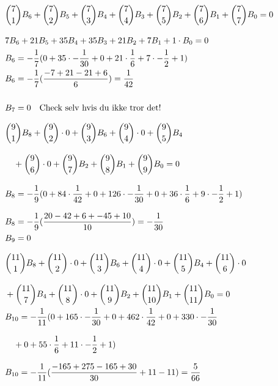 \begin{align*}
&\MinLinie
&\binom{7}{1}B_{6}+\binom{7}{2}B_{5}+\binom{7}{3}B_{4}+\binom{7}{4}B_{3}+\binom{7}{5}B_{2}+\binom{7}{6}B_{1}+\binom{7}{7}B_{0}=0\nylinie
&7B_{6}+21B_{5}+35B_{4}+35B_{3}+21B_{2}+7B_{1}+1 \cdot B_{0}=0\\
&B_{6}=-\frac{1}{7}(0+35 \cdot -\frac{1}{30}+0+21 \cdot \frac{1}{6}+7 \cdot -\frac{1}{2}+1)\\
&B_{6}=-\frac{1}{7}(\frac{-7+21-21+6}{6})=\frac{1}{42}\\\\
&B_{7}=0 \quad \text{Check selv hvis du ikke tror det!}\\
\end{align*}
\begin{align*}
&\MinLinie
&\binom{9}{1}B_{8}+\binom{9}{2} \cdot 0+\binom{9}{3}B_{6}+\binom{9}{4} \cdot 0+\binom{9}{5}B_{4}\nylinie
&\quad +\binom{9}{6} \cdot 0+\binom{9}{7}B_{2}+\binom{9}{8}B_{1}+\binom{9}{9}B_{0}=0\nylinie
&B_{8}=-\frac{1}{9}(0+84 \cdot \frac{1}{42}+0+126 \cdot -\frac{1}{30}+0+36 \cdot \frac{1}{6}+9 \cdot -\frac{1}{2}+1)\nylinie
&B_{8}=-\frac{1}{9}(\frac{20-42+6+-45+10}{10})=-\frac{1}{30}\\
&B_{9}=0\\
\end{align*}
\begin{align*}
&\MinLinie
&\binom{11}{1}B_{8}+\binom{11}{2} \cdot 0+\binom{11}{3}B_{6}+\binom{11}{4} \cdot 0+\binom{11}{5}B_{4}+\binom{11}{6} \cdot 0\nylinie
&+\binom{11}{7}B_{4}+\binom{11}{8} \cdot 0+\binom{11}{9}B_{2}+\binom{11}{10}B_{1}+\binom{11}{11}B_{0}=0\\
&B_{10}=-\frac{1}{11}(0+165 \cdot -\frac{1}{30}+0+462 \cdot \frac{1}{42}+0+330 \cdot -\frac{1}{30}\nylinie
&\quad +0+55 \cdot \frac{1}{6}+11 \cdot -\frac{1}{2}+1)\nylinie
&B_{10}=-\frac{1}{11}(\frac{-165+275-165+30}{30}+11-11)=\frac{5}{66}
\end{align*}
